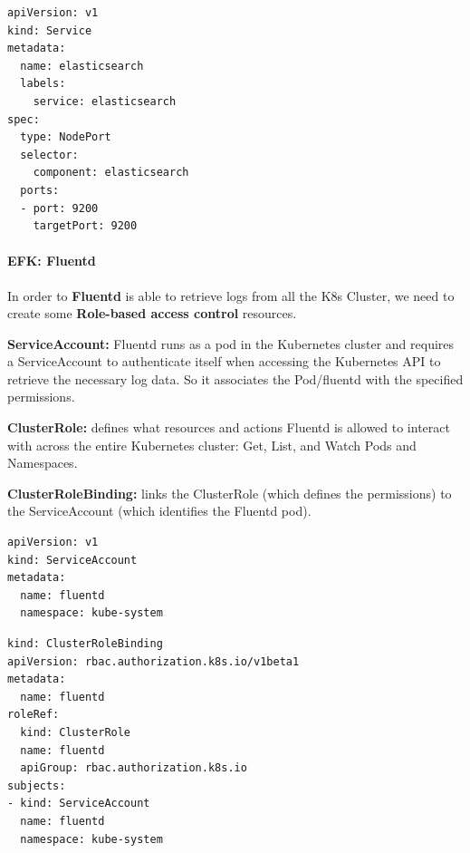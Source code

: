 \documentclass{article}
\newenvironment{codetemplate}[1][]{%
  \mybasecolorbox[#1]
  \itshape
}{%
  \endmybasecolorbox
}
\begin{document}
\begin{codetemplate}{}
\begin{verbatim}
apiVersion: v1
kind: Service
metadata:
  name: elasticsearch
  labels:
	service: elasticsearch
spec:
  type: NodePort
  selector:
	component: elasticsearch
  ports:
  - port: 9200
	targetPort: 9200
\end{verbatim}
\end{codetemplate}

\paragraph{EFK: Fluentd}

In order to \textbf{Fluentd} is able to retrieve logs from all the K8s Cluster, we need to create some \textbf{Role-based access control} resources.

\textbf{ServiceAccount:} Fluentd runs as a pod in the Kubernetes cluster and requires a ServiceAccount to authenticate itself when accessing the Kubernetes API to retrieve the necessary log data. So it associates the Pod/fluentd with the specified permissions.

\textbf{ClusterRole:} defines what resources and actions Fluentd is allowed to interact with across the entire Kubernetes cluster: Get, List, and Watch Pods and Namespaces.

\textbf{ClusterRoleBinding:} links the ClusterRole (which defines the permissions) to the ServiceAccount (which identifies the Fluentd pod).

\begin{codetemplate}{}
\begin{verbatim}
apiVersion: v1
kind: ServiceAccount
metadata:
  name: fluentd
  namespace: kube-system
\end{verbatim}
\end{codetemplate}
\begin{codetemplate}{}
\begin{verbatim}
kind: ClusterRoleBinding
apiVersion: rbac.authorization.k8s.io/v1beta1
metadata:
  name: fluentd
roleRef:
  kind: ClusterRole
  name: fluentd
  apiGroup: rbac.authorization.k8s.io
subjects:
- kind: ServiceAccount
  name: fluentd
  namespace: kube-system
\end{verbatim}
\end{codetemplate}
\end{document}
